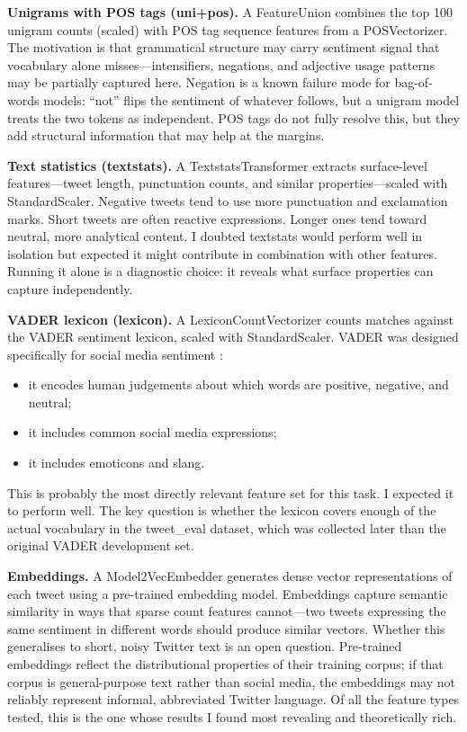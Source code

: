 \documentclass[12pt]{article}
\begin{document}
\textbf{Unigrams with POS tags (uni+pos).} A FeatureUnion combines the top 100 unigram counts (scaled) with POS tag sequence features from a POSVectorizer. The motivation is that grammatical structure may carry sentiment signal that vocabulary alone misses---intensifiers, negations, and adjective usage patterns may be partially captured here. Negation is a known failure mode for bag-of-words models: ``not'' flips the sentiment of whatever follows, but a unigram model treats the two tokens as independent. POS tags do not fully resolve this, but they add structural information that may help at the margins.

\textbf{Text statistics (textstats).} A TextstatsTransformer extracts surface-level features---tweet length, punctuation counts, and similar properties---scaled with StandardScaler. Negative tweets tend to use more punctuation and exclamation marks. Short tweets are often reactive expressions. Longer ones tend toward neutral, more analytical content. I doubted textstats would perform well in isolation but expected it might contribute in combination with other features. Running it alone is a diagnostic choice: it reveals what surface properties can capture independently.

\textbf{VADER lexicon (lexicon).} A LexiconCountVectorizer counts matches against the VADER sentiment lexicon, scaled with StandardScaler. VADER was designed specifically for social media sentiment \citep{hutto2014vader}:

\begin{itemize}

  \item it encodes human judgements about which words are positive, negative, and neutral;

  \item it includes common social media expressions;

  \item it includes emoticons and slang.

\end{itemize} This is probably the most directly relevant feature set for this task. I expected it to perform well. The key question is whether the lexicon covers enough of the actual vocabulary in the tweet\_eval dataset, which was collected later than the original VADER development set.

\textbf{Embeddings.} A Model2VecEmbedder generates dense vector representations of each tweet using a pre-trained embedding model. Embeddings capture semantic similarity in ways that sparse count features cannot---two tweets expressing the same sentiment in different words should produce similar vectors. Whether this generalises to short, noisy Twitter text is an open question. Pre-trained embeddings reflect the distributional properties of their training corpus; if that corpus is general-purpose text rather than social media, the embeddings may not reliably represent informal, abbreviated Twitter language. Of all the feature types tested, this is the one whose results I found most revealing and theoretically rich.
\end{document}
